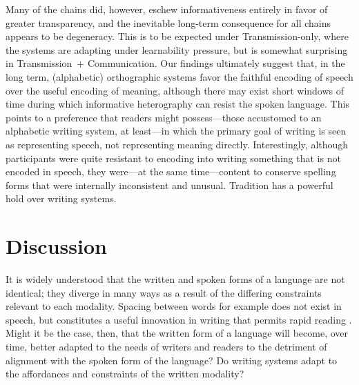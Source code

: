\documentclass[doc,biblatex]{apa7}
\begin{document}
Many of the chains did, however, eschew informativeness entirely in favor of greater transparency, and the inevitable long-term consequence for all chains appears to be degeneracy. This is to be expected under Transmission-only, where the systems are adapting under learnability pressure, but is somewhat surprising in Transmission~+ Communication. Our findings ultimately suggest that, in the long term, (alphabetic) orthographic systems favor the faithful encoding of speech over the useful encoding of meaning, although there may exist short windows of time during which informative heterography can resist the spoken language. This points to a preference that readers might possess---those accustomed to an alphabetic writing system, at least---in which the primary goal of writing is seen as representing speech, not representing meaning directly. Interestingly, although participants were quite resistant to encoding into writing something that is not encoded in speech, they were---at the same time---content to conserve spelling forms that were internally inconsistent and unusual. Tradition has a powerful hold over writing systems.


\section{Discussion}

It is widely understood that the written and spoken forms of a language are not identical; they diverge in many ways as a result of the differing constraints relevant to each modality. Spacing between words for example does not exist in speech, but constitutes a useful innovation in writing that permits rapid reading \parencite{Rastle:2019, RaynerFischer:1998, Sainio:2007, Zang:2013}. Might it be the case, then, that the written form of a language will become, over time, better adapted to the needs of writers and readers to the detriment of alignment with the spoken form of the language? Do writing systems adapt to the affordances and constraints of the written modality?
\end{document}
